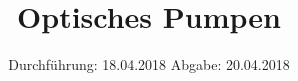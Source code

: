 

\subject{V21}
\title{Optisches Pumpen}
\date{
\centering
  Durchführung: 18.04.2018
  \hspace{3em}
  Abgabe: 20.04.2018
}



\maketitle
\thispagestyle{empty}
\tableofcontents
\newpage

%

%




\printbibliography


